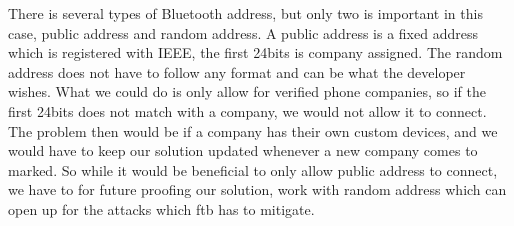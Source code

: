 There is several types of Bluetooth address, but only two is important in this case, public address and random address. A public address is a fixed address which is registered with IEEE, the first 24bits is company assigned. The random address does not have to follow any format and can be what the developer wishes\cite{BluetoothBeacon}. What we could do is only allow for verified phone companies, so if the first 24bits does not match with a company, we would not allow it to connect. The problem then would be if a company has their own custom devices, and we would have to keep our solution updated whenever a new company comes to marked. So while it would be beneficial to only allow public address to connect, we have to for future proofing our solution, work with random address which can open up for the attacks which \gls{ftb} has to mitigate.